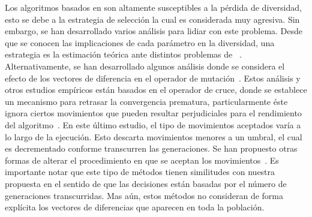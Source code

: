 Los algoritmos basados en \DE{} son altamente susceptibles a la pérdida de diversidad, esto se debe a la estrategia de selección la cual es considerada muy agresiva.
%
Sin embargo, se han desarrollado varios análisis para lidiar con este problema.
%
Desde que se conocen las implicaciones de cada parámetro en la diversidad, una estrategia es la estimación teórica ante distintos problemas de \DE{}~\cite{zaharie2003control}.
%
Alternativamente, se han desarrollado algunos análisis donde se considera el efecto de los vectores de diferencia en el operador de mutación~\cite{montgomery2009differential}.
%
Estos análisis y otros estudios empíricos están basados en el operador de cruce, donde se establece un mecanismo para retrasar la convergencia prematura, particularmente éste ignora ciertos movimientos que pueden resultar perjudiciales para el rendimiento del algoritmo~\cite{montgomery2012simple}.
%
En este último estudio, el tipo de movimientos aceptados varía a lo largo de la ejecución.
%
Esto descarta movimientos menores a un umbral, el cual es decrementado conforme transcurren las generaciones.
%
Se han propuesto otras formas de alterar el procedimiento en que se aceptan los movimientos~\cite{bolufe2013differential}.
%
Es importante notar que este tipo de métodos tienen similitudes con nuestra propuesta en el sentido de que las decisiones están basadas por el número de generaciones transcurridas.
%
%
Mas aún, estos métodos no consideran de forma explícita los vectores de diferencias que aparecen en toda la población.
%

